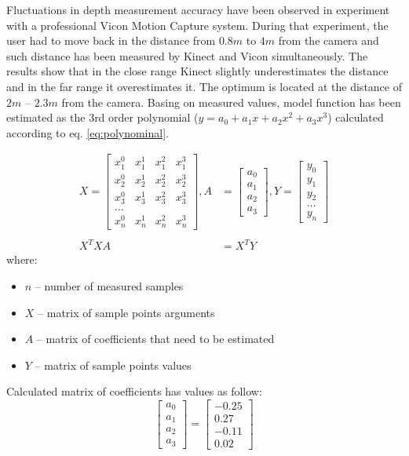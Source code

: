 \documentclass{llncs}
\begin{document}
Fluctuations in depth measurement accuracy have been observed in experiment with a professional Vicon Motion Capture system. During that experiment, the user had to move back in the distance from $0.8m$ to $4m$ from the camera and such distance has been measured by Kinect and Vicon simultaneously. The results show that in the close range Kinect slightly underestimates the distance and in the far range it overestimates it. The optimum is located at the distance of $2m$ -- $2.3m$ from the camera.  Basing on measured values, model function has been estimated as the 3rd order polynomial ($y = a_0 + a_1x + a_2x^2 + a_3x^3$) calculated according to eq. \eqref{eq:polynominal}.
		
\begin{equation}
	\begin{split}
		X = 	\begin{bmatrix}
		x_1^0&x_1^1&x_1^2&x_1^3\\			
		x_2^0&x_2^1&x_2^2&x_2^3\\
		x_3^0&x_3^1&x_3^2&x_3^3\\
		\dots\\
		x_n^0&x_n^1&x_n^2&x_n^3
		\end{bmatrix} ,
		A &= 	\begin{bmatrix}
		a_0\\a_1\\a_2\\a_3
		\end{bmatrix} ,
		Y = 
		\begin{bmatrix}
			y_0 \\y_1\\y_2\\\dots\\y_n
		\end{bmatrix} \\
		& \\
		X^TXA &= X^TY
	\end{split}
	\label{eq:polynominal}
\end{equation}
where:
\begin{itemize}
	\item $n$ -- number of measured samples
	\item $X$ -- matrix of sample points arguments
	\item $A$ -- matrix of coefficients that need to be estimated
	\item $Y$ -- matrix of sample points values
\end{itemize}
		
Calculated matrix of coefficients has values as follow:
\begin{equation*}
	\begin{bmatrix}
		a_0 \\a_1\\a_2\\a_3
	\end{bmatrix} = 
	\begin{bmatrix}
		- 0.25 \\  0.27 \\- 0.11\\0.02		
	\end{bmatrix}	
\end{equation*}
		
\end{document}
